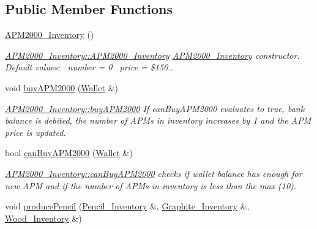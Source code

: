 \subsection*{Public Member Functions}
\begin{DoxyCompactItemize}
\item 
\mbox{\hyperlink{classAPM2000__Inventory_a0aa6a0abe496ccd0ee773c4a3ce38a2c}{A\+P\+M2000\+\_\+\+Inventory}} ()
\begin{DoxyCompactList}\small\item\em \mbox{\hyperlink{classAPM2000__Inventory_a0aa6a0abe496ccd0ee773c4a3ce38a2c}{A\+P\+M2000\+\_\+\+Inventory\+::\+A\+P\+M2000\+\_\+\+Inventory}} \mbox{\hyperlink{classAPM2000__Inventory}{A\+P\+M2000\+\_\+\+Inventory}} constructor.~\newline
Default values\+:~\newline
number = 0~\newline
price = \$150.. \end{DoxyCompactList}\item 
void \mbox{\hyperlink{classAPM2000__Inventory_a5f89890fced248efa0792e0ac062e9e2}{buy\+A\+P\+M2000}} (\mbox{\hyperlink{classWallet}{Wallet}} \&)
\begin{DoxyCompactList}\small\item\em \mbox{\hyperlink{classAPM2000__Inventory_a5f89890fced248efa0792e0ac062e9e2}{A\+P\+M2000\+\_\+\+Inventory\+::buy\+A\+P\+M2000}} If can\+Buy\+A\+P\+M2000 evaluates to true, bank balance is debited, the number of A\+P\+Ms in inventory increases by 1 and the A\+PM price is updated. \end{DoxyCompactList}\item 
bool \mbox{\hyperlink{classAPM2000__Inventory_a8edb69c3a8614e7b709605f59a3c409b}{can\+Buy\+A\+P\+M2000}} (\mbox{\hyperlink{classWallet}{Wallet}} \&)
\begin{DoxyCompactList}\small\item\em \mbox{\hyperlink{classAPM2000__Inventory_a8edb69c3a8614e7b709605f59a3c409b}{A\+P\+M2000\+\_\+\+Inventory\+::can\+Buy\+A\+P\+M2000}} checks if wallet balance has enough for new A\+PM and if the number of A\+P\+Ms in inventory is less than the max (10). \end{DoxyCompactList}\item 
void \mbox{\hyperlink{classAPM2000__Inventory_ad7ffc7e7536509d26d76800b2398bfc0}{produce\+Pencil}} (\mbox{\hyperlink{classPencil__Inventory}{Pencil\+\_\+\+Inventory}} \&, \mbox{\hyperlink{classGraphite__Inventory}{Graphite\+\_\+\+Inventory}} \&, \mbox{\hyperlink{classWood__Inventory}{Wood\+\_\+\+Inventory}} \&)

\end{DoxyCompactItemize}
